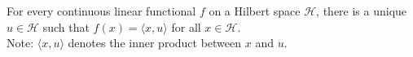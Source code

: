 \documentclass[12pt]{article}
\begin{document}
For every continuous linear functional $f$ on a Hilbert space $\mathcal{H}$, there is a unique $u\in \mathcal{H}$ such that $f(x)=\langle x,u \rangle$ for all $x\in\mathcal{H}$.\\
Note: $\langle x,u \rangle$ denotes the inner product between $x$ and $u$.
\end{document}
